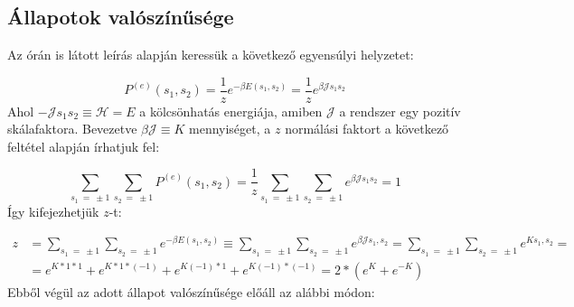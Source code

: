 \section{} \label{sec:2}

\subsection{Állapotok valószínűsége}
Az órán is látott leírás alapján keressük a következő egyensúlyi helyzetet:

\begin{equation} \label{eq:5}
    P^{\left( e \right)} \left( s_{1}, s_{2} \right)
    =
    \frac{1}{z} e^{- \beta E \left( s_{1}, s_{2} \right)}
    =
    \frac{1}{z} e^{\beta \mathcal{J} s_{1} s_{2}}
\end{equation}
Ahol $- \mathcal{J} s_{1} s_{2} \equiv \mathscr{H} = E$ a kölcsönhatás energiája, amiben $\mathcal{J}$ a rendszer egy pozitív skálafaktora. Bevezetve $\beta \mathcal{J} \equiv K$ mennyiséget, a $z$ normálási faktort a következő feltétel alapján írhatjuk fel:

\begin{equation} \label{eq:6}
    \sum_{s_{1}\ =\ \pm 1} \sum_{s_{2}\ =\ \pm 1} P^{\left( e \right)} \left( s_{1}, s_{2} \right)
    =
    \frac{1}{z} \sum_{s_{1}\ =\ \pm 1} \sum_{s_{2}\ =\ \pm 1} e^{\beta \mathcal{J} s_{1} s_{2}}
    =
    1
\end{equation}
Így kifejezhetjük $z$-t:

\begin{align} \label{eq:7}
    z
    &=
    \sum_{s_{1}\ =\ \pm 1} \sum_{s_{2}\ =\ \pm 1} e^{- \beta E \left( s_{1}, s_{2} \right)}
    \equiv
    \sum_{s_{1}\ =\ \pm 1} \sum_{s_{2}\ =\ \pm 1} e^{\beta \mathcal{J} s_{1}, s_{2}}
    =
    \sum_{s_{1}\ =\ \pm 1} \sum_{s_{2}\ =\ \pm 1} e^{K s_{1}, s_{2}}
    = \nonumber \\
    &=
    e^{K * 1 * 1} + e^{K * 1 * \left( -1 \right)} + e^{K \left( -1 \right) * 1} + e^{K \left( -1 \right) * \left( -1 \right)}
    =
    2 * \left( e^{K} + e^{-K} \right)
\end{align}
Ebből végül az adott állapot valószínűsége előáll az alábbi módon:

